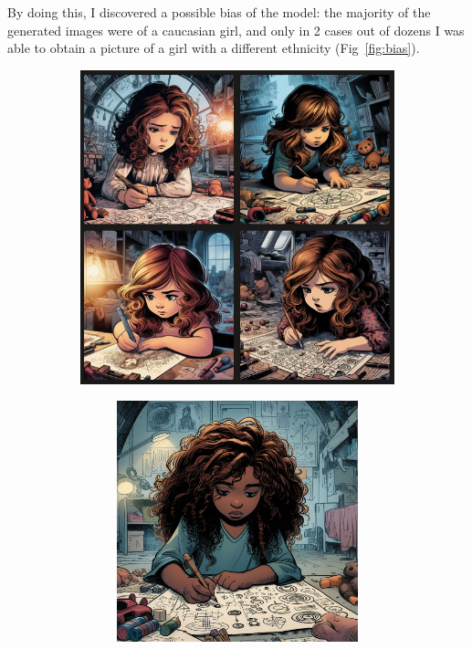\documentclass[a4paper,11pt]{article}
\begin{document}
By doing this, I discovered a possible bias of the model: the majority of the generated images were of a caucasian girl, and only in 2 cases out of dozens I was able to obtain a picture of a girl with a different ethnicity (Fig~\vref{fig:bias}).\medskip

\begin{figure}
    \centering
    \begin{subfigure}{0.6\textwidth}
        \includegraphics[width=\textwidth]{figures/caucasian.png}
    \end{subfigure}
    \hfill 
    \begin{subfigure}{0.353\textwidth}
        \begin{subfigure}{1\textwidth}
            \includegraphics[width=\textwidth]{figures/bias.jpeg}

\end{subfigure}
\end{subfigure}
\end{figure}
\end{document}
